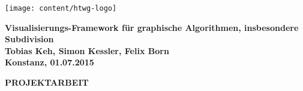 \begin{titlepage}

\vspace*{-3.5cm}

\begin{flushleft}
\hspace*{-1cm} \texttt{[image: content/htwg-logo]}
\end{flushleft}

\vspace{2.5cm}

\begin{center}
	\huge{
		\textbf{Visualisierungs-Framework für graphische Algorithmen, insbesondere Subdivision} \\[5cm]
	}
	\Large{
		\textbf{Tobias Keh, Simon Kessler, Felix Born}} \\[6.5cm]
	\large{
		\textbf{Konstanz, 01.07.2015} \\[2.3cm]
	}
	
	\Huge{
		\textbf{{\sf PROJEKTARBEIT}}
	}
\end{center}

\end{titlepage}